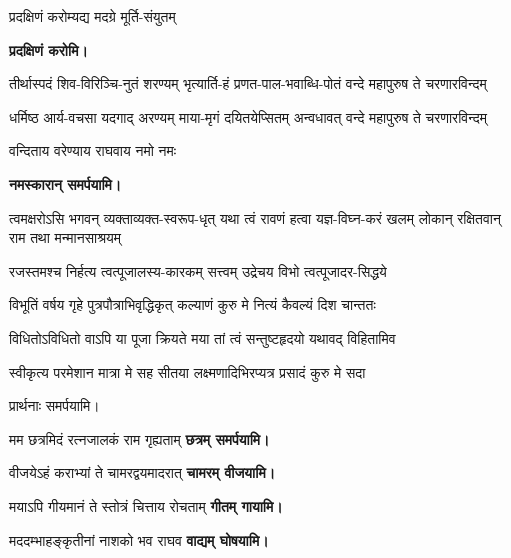 \begin{center}
{प्रदक्षिणं करोम्यद्य मदग्रे मूर्ति-संयुतम्}

\textbf{\devAya{} प्रदक्षिणं करोमि।}

{तीर्थास्पदं शिव-विरिञ्चि-नुतं शरण्यम्}
{भृत्यार्ति-हं प्रणत-पाल-भवाब्धि-पोतं}
{वन्दे महापुरुष ते चरणारविन्दम्}

{धर्मिष्ठ आर्य-वचसा यदगाद् अरण्यम्}
{माया-मृगं दयितयेप्सितम् अन्वधावत्}
{वन्दे महापुरुष ते चरणारविन्दम्}

{वन्दिताय वरेण्याय राघवाय नमो नमः }

\textbf{\devAya{} नमस्कारान् समर्पयामि।}

\resetShloka
\threelineshloka
{त्वमक्षरोऽसि भगवन् व्यक्ताव्यक्त-स्वरूप-धृत्}
{यथा त्वं रावणं हत्वा यज्ञ-विघ्न-करं खलम्}
{लोकान् रक्षितवान् राम तथा मन्मानसाश्रयम्}

\twolineshloka
{रजस्तमश्च निर्हत्य त्वत्पूजालस्य-कारकम्}
{सत्त्वम् उद्रेचय विभो त्वत्पूजादर-सिद्धये}

\twolineshloka
{विभूतिं वर्षय गृहे पुत्रपौत्राभिवृद्धिकृत्}
{कल्याणं कुरु मे नित्यं कैवल्यं दिश चान्ततः}

\twolineshloka
{विधितोऽविधितो वाऽपि या पूजा क्रियते मया}
{तां त्वं सन्तुष्टहृदयो यथावद् विहितामिव}

\twolineshloka
{स्वीकृत्य परमेशान मात्रा मे सह सीतया}
{लक्ष्मणादिभिरप्यत्र प्रसादं कुरु मे सदा}

प्रार्थनाः समर्पयामि।

\begin{center}

\end{center}

{मम छत्रमिदं रत्नजालकं राम गृह्यताम्}
\textbf{\hfill छत्रम् समर्पयामि।}

{वीजयेऽहं कराभ्यां ते चामरद्वयमादरात्}
\textbf{\hfill चामरम् वीजयामि।}

{मयाऽपि गीयमानं ते स्तोत्रं चित्ताय रोचताम्}
\textbf{\hfill गीतम् गायामि।}

{मददम्भाहङ्कृतीनां नाशको भव राघव}
\textbf{\hfill वाद्यम् घोषयामि।}


\end{center}
